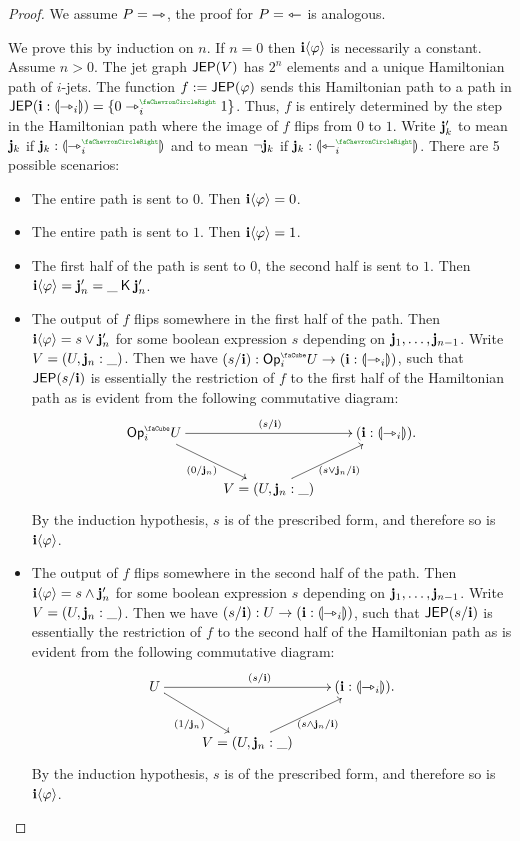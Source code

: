 \documentclass[a4paper]{memoir}
\begin{document}
\begin{proof}
%
	We assume $P = {\rightarrowtriangle}$, the proof for $P = {\leftarrowtriangle}$ is analogous.

	We prove this by induction on $n$.
	If $n = 0$ then $\mathbf{i} \langle \varphi \rangle$ is necessarily a constant.
	Assume $n > 0$.
	The jet graph $\mathsf{JEP}(V)$ has $2^n$ elements and a unique Hamiltonian path of $i$-jets.
	The function $f := \mathsf{JEP}(\varphi)$ sends this Hamiltonian path to a path in $\JEP(\dm i : \rival{\jet_i}) = \accol{0 \jet_i\pmr{\ypolar} 1}$.
	Thus, $f$ is entirely determined by the step in the Hamiltonian path where the image of $f$ flips from $0$ to $1$.
	Write $\mathbf{j}_k'$ to mean $\mathbf{j}_k$ if $\dm j_k : \rival{\jet_i\pmr{\ypolar}}$ and to mean $\lnot \mathbf{j}_k$ if $\dm j_k : \rival{\tej_i\pmr{\ypolar}}$.
	There are 5 possible scenarios:
	\begin{itemize}
		\item The entire path is sent to $0$. Then $\mathbf{i} \langle \varphi \rangle = 0$.
		\item The entire path is sent to $1$. Then $\mathbf{i} \langle \varphi \rangle = 1$.
		\item The first half of the path is sent to $0$, the second half is sent to $1$. Then $\mathbf{i} \langle \varphi \rangle = \mathbf{j}_n' = \_ \mathbin{\mathsf{K}} \mathbf{j}_n'$.
		\item The output of $f$ flips somewhere in the first half of the path.
		Then $\mathbf{i} \langle \varphi \rangle = s \vee \mathbf{j}_n'$ for some boolean expression $s$ depending on $\mathbf{j}_1, \ldots, \mathbf{j}_{n-1}$.
		Write $V = (U, \mathbf{j}_n : \_)$.
		Then we have $(s/\dm i) : \Opcube_i U \to (\dm i : \rival{\jet_i})$, such that $\mathsf{JEP}(s/\mathbf{i})$ is essentially the restriction of $f$ to the first half of the Hamiltonian path as is evident from the following commutative diagram:
		\[
			\xymatrix{
				\Opcube_i U
					\ar[rr]^{(s/\dm i)}
					\ar[rd]_{(0/\dm j_n)}
				&&
				(\dm i : \rival{\jet_i}).
				\\
				& V = (U, \dm j_n : \_)
					\ar[ru]_{(s \vee \dm j_n / \dm i)}
			}
		\]
		By the induction hypothesis, $s$ is of the prescribed form, and therefore so is $\mathbf{i} \langle \varphi \rangle$.
		\item The output of $f$ flips somewhere in the second half of the path.
		Then $\mathbf{i} \langle \varphi \rangle = s \wedge \mathbf{j}_n'$ for some boolean expression $s$ depending on $\mathbf{j}_1, \ldots, \mathbf{j}_{n-1}$.
		Write $V = (U, \mathbf{j}_n : \_)$.
		Then we have $(s/\mathbf{i}) : U \to (\mathbf{i} : {\llparenthesis \rightarrowtriangle_i \rrparenthesis})$, such that $\mathsf{JEP}(s/\mathbf{i})$ is essentially the restriction of $f$ to the second half of the Hamiltonian path as is evident from the following commutative diagram:
		\[
			\xymatrix{
				U
					\ar[rr]^{(s/\dm i)}
					\ar[rd]_{(1/\dm j_n)}
				&&
				(\dm i : \rival{\jet_i}).
				\\
				& V = (U, \dm j_n : \_)
					\ar[ru]_{(s \wedge \dm j_n / \dm i)}
			}
		\]
		By the induction hypothesis, $s$ is of the prescribed form, and therefore so is $\mathbf{i} \langle \varphi \rangle$. \qedhere
	\end{itemize}
\end{proof}
\end{document}
